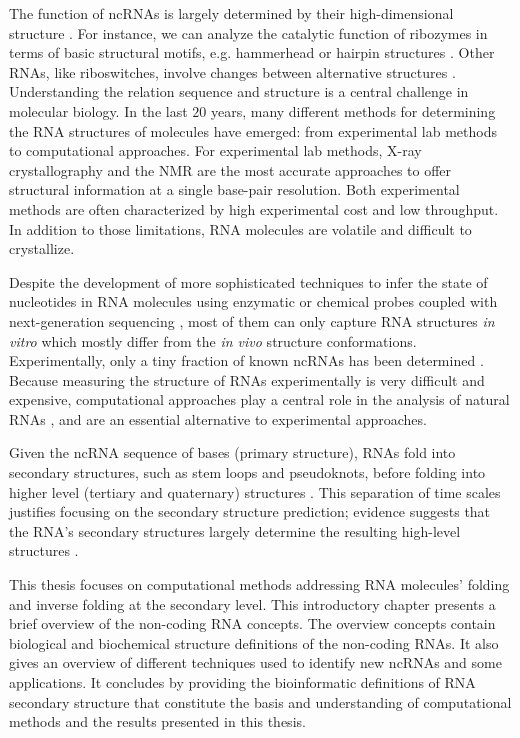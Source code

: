 The function of \acp{ncRNA} is largely determined by their high-dimensional structure \cite{cech2014noncoding}. For instance, we can analyze the catalytic function of ribozymes in terms of basic structural motifs, e.g. hammerhead or hairpin structures \cite{doherty2001ribozyme}. Other \acp{RNA}, like riboswitches, involve changes between alternative structures  \cite{vitreschak04_ribos}. Understanding the relation sequence and structure is a central challenge in molecular biology. In the last $20$ years, many different methods for determining the \ac{RNA} structures of molecules have emerged: from experimental lab methods to computational approaches. For experimental lab methods, X-ray crystallography and the \ac{NMR} are the most accurate approaches to offer structural information at a single base-pair resolution. Both experimental methods are often characterized by high experimental cost and low throughput. In addition to those limitations, \ac{RNA} molecules are volatile and difficult to crystallize.

Despite the development of more sophisticated techniques to infer the state of nucleotides in \ac{RNA} molecules using enzymatic \cite{kertesz2010genome, underwood2010fragseq} or chemical probes \cite{tijerina2007dms, wilkinson2006selective} coupled with next-generation sequencing \cite{bevilacqua2016genome, tian2016rna}, most of them can only capture \ac{RNA} structures \textit{in vitro} which mostly differ from the \textit{in vivo} structure conformations. Experimentally, only a tiny fraction of known \acp{ncRNA} has been determined \cite{rnacentral2017rnacentral}. Because measuring the structure of \acp{RNA} experimentally is very difficult and expensive, computational approaches play a central role in the analysis of natural \acp{RNA} \cite{seetin2012rna, fallmann2017recent}, and are an essential alternative to experimental approaches. 

Given the \ac{ncRNA} sequence of bases (primary structure), RNAs fold into secondary structures, such as stem loops and pseudoknots, before folding into higher level (tertiary and quaternary) structures \cite{brion1997hierarchy,tinoco1999rna}. This separation of time scales justifies focusing on the secondary structure prediction; evidence suggests that the \ac{RNA}'s secondary structures largely determine the resulting high-level structures \cite{tinoco1999rna}. 

This thesis focuses on computational methods addressing \ac{RNA} molecules' folding and inverse folding at the secondary level. This introductory chapter presents a brief overview of the non-coding \ac{RNA} concepts. The overview concepts contain biological and biochemical structure definitions of the non-coding \acp{RNA}. It also gives an overview of different techniques used to identify new \acp{ncRNA} and some applications. It concludes by providing the bioinformatic definitions of \ac{RNA} secondary structure that constitute the basis and understanding of computational methods and the results presented in this thesis.

